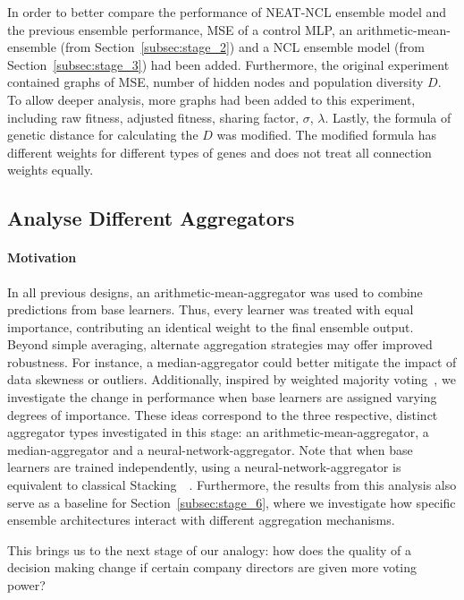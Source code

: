 In order to better compare the performance of NEAT-NCL ensemble model and the previous ensemble performance, MSE of a control MLP, an arithmetic-mean-ensemble (from Section~\ref{subsec:stage_2}) and a NCL ensemble model (from Section~\ref{subsec:stage_3}) had been added. Furthermore, the original experiment contained graphs of MSE, number of hidden nodes and population diversity $D$. To allow deeper analysis, more graphs had been added to this experiment, including raw fitness, adjusted fitness, sharing factor, $\sigma$, $\lambda$. Lastly, the formula of genetic distance for calculating the $D$ was modified. The modified formula has different weights for different types of genes and does not treat all connection weights equally. 


\subsection{Analyse Different Aggregators}
\label{subsec:stage_5}
\paragraph{Motivation}
In all previous designs, an arithmetic-mean-aggregator was used to combine predictions from base learners. Thus, every learner was treated with equal importance, contributing an identical weight to the final ensemble output. Beyond simple averaging, alternate aggregation strategies may offer improved robustness. For instance, a median-aggregator could better mitigate the impact of data skewness or outliers. Additionally, inspired by weighted majority voting~\cite{littlestone1994weighted}, we investigate the change in performance when base learners are assigned varying degrees of importance. These ideas correspond to the three respective, distinct aggregator types investigated in this stage: an arithmetic-mean-aggregator, a median-aggregator and a neural-network-aggregator. Note that when base learners are trained independently, using a neural-network-aggregator is equivalent to classical Stacking~\cite{wolpert1992stacked}~\cite{breiman1996stacked}. Furthermore, the results from this analysis also serve as a baseline for Section~\ref{subsec:stage_6}, where we investigate how specific ensemble architectures interact with different aggregation mechanisms. 

This brings us to the next stage of our analogy: how does the quality of a decision making change if certain company directors are given more voting power? 


